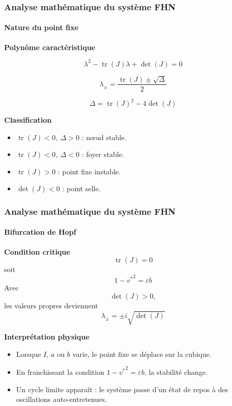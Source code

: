 \begin{frame}
\frametitle{Analyse mathématique du système FHN}
\framesubtitle{Nature du point fixe}

\alert{\textbf{Polynôme caractéristique}}

\[
\lambda^2-\operatorname{tr}(J)\lambda+\det(J)=0
\]

\[
\lambda_{\pm}
=
\frac{\operatorname{tr}(J)\pm\sqrt{\Delta}}{2}
\]

\[
\Delta=
\operatorname{tr}(J)^2-4\det(J)
\]

\alert{\textbf{Classification}}

\begin{itemize}
\item $\operatorname{tr}(J)<0,\ \Delta>0$
      : nœud stable.

\item $\operatorname{tr}(J)<0,\ \Delta<0$
      : foyer stable.

\item $\operatorname{tr}(J)>0$
      : point fixe instable.

\item $\det(J)<0$
      : point selle.
\end{itemize}

\end{frame}

\begin{frame}
\frametitle{Analyse mathématique du système FHN}
\framesubtitle{Bifurcation de Hopf}

\alert{\textbf{Condition critique}}
\[
\operatorname{tr}(J)=0
\]
soit
\[
1-{v^*}^2=\varepsilon b
\]
Avec
\[
\det(J)>0,
\]
les valeurs propres deviennent
\[
\lambda_{\pm}
=
\pm i\sqrt{\det(J)}
\]

\bigskip

\alert{\textbf{Interprétation physique}}

\begin{itemize}
\item Lorsque \(I\), \(a\) ou \(b\) varie, le point fixe se déplace sur la cubique.

\item En franchissant la condition
\(
1-{v^*}^2=\varepsilon b
\),
la stabilité change.

\item Un cycle limite apparaît :
le système passe d'un état de repos à des oscillations auto-entretenues.
\end{itemize}
\end{frame}

